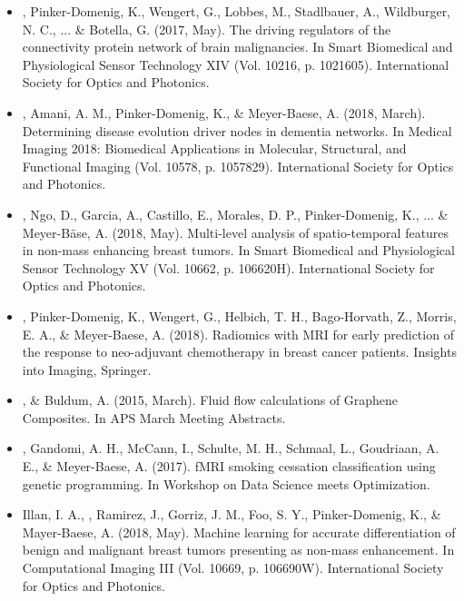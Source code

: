 \documentclass[]{template}
\begin{document}
\begin{itemize}
\item {}, Pinker-Domenig, K., Wengert, G., Lobbes, M., Stadlbauer, A., Wildburger, N. C., ... \& Botella, G. (2017, May). The driving regulators of the connectivity protein network of brain malignancies. In Smart Biomedical and Physiological Sensor Technology XIV (Vol. 10216, p. 1021605). International Society for Optics and Photonics.

\item {}, Amani, A. M., Pinker-Domenig, K., \& Meyer-Baese, A. (2018, March). Determining disease evolution driver nodes in dementia networks. In Medical Imaging 2018: Biomedical Applications in Molecular, Structural, and Functional Imaging (Vol. 10578, p. 1057829). International Society for Optics and Photonics.

\item {}, Ngo, D., Garcia, A., Castillo, E., Morales, D. P., Pinker-Domenig, K., ... \& Meyer-Bäse, A. (2018, May). Multi-level analysis of spatio-temporal features in non-mass enhancing breast tumors. In Smart Biomedical and Physiological Sensor Technology XV (Vol. 10662, p. 106620H). International Society for Optics and Photonics.

\item {}, Pinker-Domenig, K., Wengert, G., Helbich, T. H., Bago-Horvath, Z., Morris, E. A., \& Meyer-Baese, A. (2018). Radiomics with MRI for early prediction of the response to neo-adjuvant chemotherapy in breast cancer patients. Insights into Imaging, Springer.

\item {}, \& Buldum, A. (2015, March). Fluid flow calculations of Graphene Composites. In APS March Meeting Abstracts.

\item {}, Gandomi, A. H., McCann, I., Schulte, M. H., Schmaal, L., Goudriaan, A. E., \& Meyer-Baese, A. (2017). fMRI smoking cessation classification using genetic programming. In Workshop on Data Science meets Optimization.

\item Illan, I. A., , Ramirez, J., Gorriz, J. M., Foo, S. Y., Pinker-Domenig, K., \& Mayer-Baese, A. (2018, May). Machine learning for accurate differentiation of benign and malignant breast tumors presenting as non-mass enhancement. In Computational Imaging III (Vol. 10669, p. 106690W). International Society for Optics and Photonics.


\end{itemize}
\end{document}
